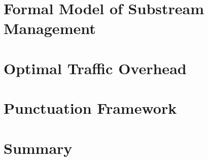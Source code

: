 

\section{Formal Model of Substream Management}
\label{fs-acker-preliminaries}


\section{Optimal Traffic Overhead}
\label{fs-acker-optimal}


\section{Punctuation Framework}
\label{fs-acker-punctuations}


\section{Summary}
\label{fs-acker-summary}
